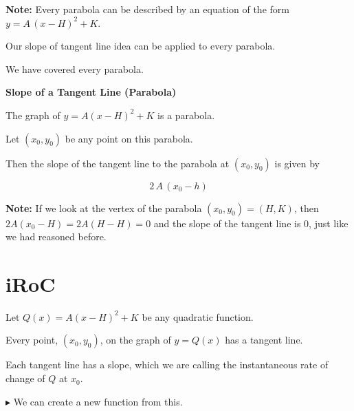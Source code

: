 \documentclass{ximera}
\begin{document}
\textbf{Note:} Every parabola can be described by an equation of the form $y = A \, (x - H)^2 + K$. 

Our slope of tangent line idea can be applied to every parabola. 

We have covered every parabola. 














\begin{theorem} \textbf{\textcolor{-red!75!green}{Slope of a Tangent Line (Parabola)}} 


The graph of $y = A (x - H)^2 + K$ is a parabola.

Let $(x_0, y_0)$ be any point on this parabola.

Then the slope of the tangent line to the parabola at $(x_0, y_0)$ is given by 



\[ 2 \, A \, (x_0 - h) \]


\end{theorem}












\textbf{Note:} If we look at the vertex of the parabola $(x_0, y_0) = (H, K)$, then $2 A (x_0 - H) = 2 A (H - H) = 0$ and the slope of the tangent line is $0$, just like we had reasoned before. 











\section*{iRoC}

Let $Q(x) = A (x - H)^2 + K$ be any quadratic function.

Every point, $(x_0, y_0)$, on the graph of $y = Q(x)$ has a tangent line.

Each tangent line has a slope, which we are calling the instantaneous rate of change of $Q$ at $x_0$.


\textbf{\textcolor{red!70!darkgray}{$\blacktriangleright$}} We can create a new function from this.
\end{document}
